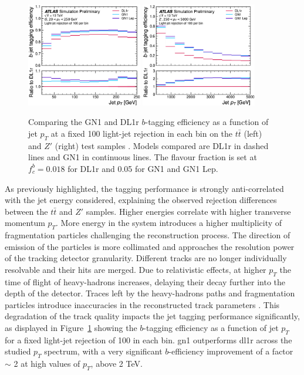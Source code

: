 \begin{figure}[h!]
  \centering
  \includegraphics[width=0.45\textwidth]{Images/FTAG/GN/GN1/eff/ptttb.png}
  \includegraphics[width=0.45\textwidth]{Images/FTAG/GN/GN1/eff/ptzpb.png}
  \caption{Comparing the GN1 and DL1r $b$-tagging efficiency as a function of jet $p_T$ at a fixed 100 light-jet rejection in each bin on the $t\bar{t}$ (left) and $Z'$ (right) test samples \cite{ATL-PHYS-PUB-2022-027}. Models compared are DL1r in dashed lines and GN1 in continuous lines. The flavour fraction is set at $f^b_c = 0.018$ for DL1r and 0.05 for GN1 and GN1 Lep.}
  \label{fig:GN1ptb}
\end{figure} 

As previously highlighted, the tagging performance is strongly anti-correlated with the jet energy considered, explaining the observed rejection differences between the $t\bar{t}$ and $Z'$ samples. Higher energies correlate with higher transverse momentum $p_T$. More energy in the system introduces a higher multiplicity of fragmentation particles challenging the reconstruction process. The direction of emission of the particles is more collimated and approaches the resolution power of the tracking detector granularity. Different tracks are no longer individually resolvable and their hits are merged. Due to relativistic effects, at higher $p_T$ the time of flight of heavy-hadrons increases, delaying their decay further into the depth of the detector. Traces left by the heavy-hadrons paths and fragmentation particles introduce inaccuracies in the reconstructed track parameters \cite{ATLAS-tracks-algo}. This degradation of the track quality impacts the jet tagging performance significantly, as displayed in Figure~\ref{fig:GN1ptb} showing the $b$-tagging efficiency as a function of jet $p_T$ for a fixed light-jet rejection of 100 in each bin. \gls{gn1} outperforms \gls{dl1r} across the studied $p_T$ spectrum, with a very significant $b$-efficiency improvement of a factor $\sim$ 2 at high values of $p_T$, above 2 TeV. \\

